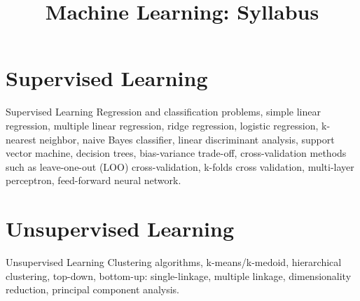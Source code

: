 \documentclass{beamer}
\title{Machine Learning: Syllabus}
\date{}
\begin{document}
    \begin{frame}
        \titlepage
    \end{frame}

    \section{Supervised Learning}
    \begin{frame}{Supervised Learning}
        Regression and classification problems, simple linear regression, multiple linear regression, ridge regression, logistic regression, k-nearest neighbor, naive Bayes classifier, linear discriminant analysis, support vector machine, decision trees, bias-variance trade-off, cross-validation methods such as leave-one-out (LOO) cross-validation, k-folds cross validation, multi-layer perceptron, feed-forward neural network.
    \end{frame}

    \section{Unsupervised Learning}
    \begin{frame}{Unsupervised Learning}
        Clustering algorithms, k-means/k-medoid, hierarchical clustering, top-down, bottom-up: single-linkage, multiple linkage, dimensionality reduction, principal component analysis.
    \end{frame}
\end{document}
